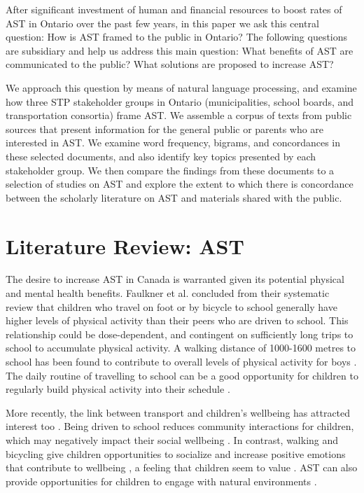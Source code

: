 \documentclass[preprint, 3p,
authoryear]{elsarticle} %
\begin{document}
After significant investment of human and financial resources to boost
rates of AST in Ontario over the past few years, in this paper we ask
this central question: How is AST framed to the public in Ontario? The
following questions are subsidiary and help us address this main
question: What benefits of AST are communicated to the public? What
solutions are proposed to increase AST?

We approach this question by means of natural language processing, and
examine how three STP stakeholder groups in Ontario (municipalities,
school boards, and transportation consortia) frame AST. We assemble a
corpus of texts from public sources that present information for the
general public or parents who are interested in AST. We examine word
frequency, bigrams, and concordances in these selected documents, and
also identify key topics presented by each stakeholder group. We then
compare the findings from these documents to a selection of studies on
AST and explore the extent to which there is concordance between the
scholarly literature on AST and materials shared with the public.

\hypertarget{literature-review-ast}{%
\section{Literature Review: AST}\label{literature-review-ast}}

The desire to increase AST in Canada is warranted given its potential
physical and mental health benefits. Faulkner et al.
\citeyearpar{faulknerActiveSchoolTransport2009} concluded from their
systematic review that children who travel on foot or by bicycle to
school generally have higher levels of physical activity than their
peers who are driven to school. This relationship could be
dose-dependent, and contingent on sufficiently long trips to school to
accumulate physical activity. A walking distance of 1000-1600 metres to
school has been found to contribute to overall levels of physical
activity for boys \citep{faulknerSchoolTravelChildren2013}. The daily
routine of travelling to school can be a good opportunity for children
to regularly build physical activity into their schedule
\citep{mitraIndependentMobilityMode2013}.

More recently, the link between transport and children's wellbeing has
attracted interest too \citep{waygoodTransportChildrenWellbeing2020}.
Being driven to school reduces community interactions for children,
which may negatively impact their social wellbeing
\citep{waygoodChildrenTravelIncidental2015}. In contrast, walking and
bicycling give children opportunities to socialize
\citep{michailChildrenExperiencesTheir2021} and increase positive
emotions that contribute to wellbeing
\citep{ramanathanHappinessMotionEmotions2014a}, a feeling that children
seem to value \citep{zwertsHowChildrenView2010}. AST can also provide
opportunities for children to engage with natural environments
\citep{fuscoUnderstandingChildrenPerceptions2012, romeroChildrenExperiencesEnjoyment2015}.
\end{document}
